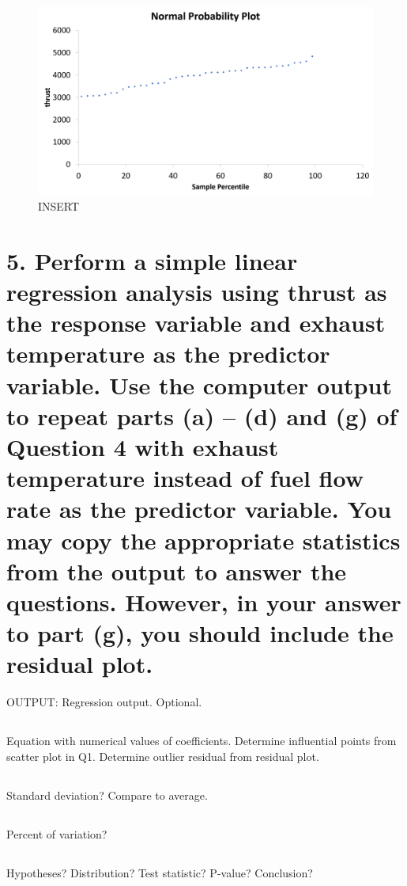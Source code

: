\documentclass[letterpaper]{article}
\begin{document}
\begin{figure}[H]
 \centering
 \includegraphics[width=\textwidth]{normalplot.png}
 \caption{INSERT}
\end{figure}

\section{5.	Perform a simple linear regression analysis using thrust as the response variable and exhaust temperature as the predictor variable. Use the computer output to repeat parts (a) – (d) and (g) of Question 4 with exhaust temperature instead of fuel flow rate as the predictor variable. You may copy the appropriate statistics from the output to answer the questions. However, in your answer to part (g), you should include the residual plot.}
OUTPUT: Regression output. Optional.

\subsection{}
Equation with numerical values of coefficients. Determine
influential points from scatter plot in Q1. Determine outlier residual from residual plot.

\subsection{}
Standard deviation? Compare to average.

\subsection{}
Percent of variation?

\subsection{}
Hypotheses? Distribution? Test statistic? P-value? Conclusion?
\end{document}
